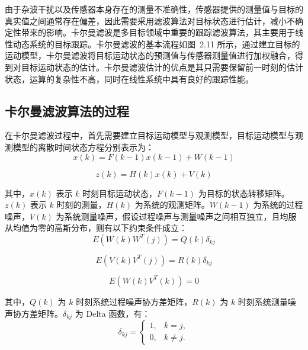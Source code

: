 \documentclass{xdupgthesis}
\begin{document}
由于杂波干扰以及传感器本身存在的测量不准确性，传感器提供的测量值与目标的真实值之间通常存在偏差，因此需要采用滤波算法对目标状态进行估计，减小不确定性带来的影响。卡尔曼滤波是多目标领域中重要的跟踪滤波算法，其主要用于线性动态系统的目标跟踪。卡尔曼滤波的基本流程如图~2.11 所示，通过建立目标的运动模型，卡尔曼滤波将目标运动状态的预测值与传感器测量值进行加权融合，得到对目标运动状态的估计。卡尔曼滤波估计的优点是其只需要保留前一时刻的估计状态，运算的复杂性不高，同时在线性系统中具有良好的跟踪性能。

\subsection{卡尔曼滤波算法的过程}

在卡尔曼滤波过程中，首先需要建立目标运动模型与观测模型，目标运动模型与观测模型的离散时间状态方程分别表示为：
\begin{equation}
	x(k)=F(k-1)x(k-1)+W(k-1)
	\tag{2-2}
\end{equation}

\begin{equation}
	z(k)=H(k)x(k)+V(k)
	\tag{2-3}
\end{equation}

其中，$x(k)$ 表示 $k$ 时刻目标运动状态，$F(k-1)$ 为目标的状态转移矩阵。$z(k)$ 表示 $k$ 时刻的测量，$H(k)$ 为系统的观测矩阵。$W(k-1)$ 为系统的过程噪声，$V(k)$ 为系统测量噪声，假设过程噪声与测量噪声之间相互独立，且均服从均值为零的高斯分布，则有以下约束条件成立：
\begin{equation}
	E\!\left(W(k)W^{T}(j)\right)=Q(k)\delta_{kj}
	\tag{2-4}
\end{equation}

\begin{equation}
	E\!\left(V(k)V^{T}(j)\right)=R(k)\delta_{kj}
	\tag{2-5}
\end{equation}

\begin{equation}
	E\!\left(W(k)V^{T}(k)\right)=0
	\tag{2-6}
\end{equation}

其中，$Q(k)$ 为 $k$ 时刻系统过程噪声协方差矩阵，$R(k)$ 为 $k$ 时刻系统测量噪声协方差矩阵。$\delta_{kj}$ 为 Delta 函数，有：
\begin{equation}
	\delta_{kj}=
	\begin{cases}
		1, & k=j,\\
		0, & k\neq j.
	\end{cases}
	\tag{2-7}
\end{equation}
\end{document}
